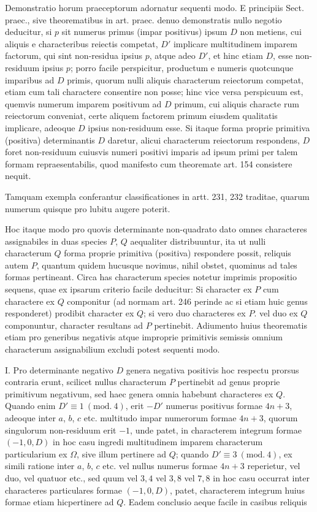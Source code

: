 Demonstratio horum praeceptorum adornatur sequenti modo. E principiis
Sect. praec., sive theorematibus in art. praec. denuo demonstratis nullo negotio
deducitur, si $p$ sit numerus primus (impar positivus) ipsum $D$ non metiens, cui
aliquis e characteribus reiectis competat, $D'$ implicare multitudinem imparem
factorum, qui sint non-residua ipsius $p$, atque adeo $D'$, et hinc etiam $D$, esse
non-residuum ipsius $p$; porro facile perspicitur, productum e numeris quotcunque
imparibus ad $D$ primis, quorum nulli aliquis characterum reiectorum competat,
etiam cum tali charactere consentire non posse; hinc vice versa perspicuum
est, quemvis numerum imparem positivum ad $D$ primum, cui aliquis characte%
%
rum reiectorum conveniat, certe aliquem factorem primum eiusdem qualitatis implicare,
adeoque $D$ ipsius non-residuum esse. Si itaque forma proprie primitiva
(positiva) determinantis $D$ daretur, alicui characterum reiectorum respondens,
$D$ foret non-residuum cuiusvis numeri positivi imparis ad ipsum primi per talem
formam repraesentabilis, quod manifesto cum theoremate art. 154 consistere
nequit.

Tamquam exempla conferantur classificationes in artt. 231, 232 traditae,
quarum numerum quisque pro lubitu augere poterit.

Hoc itaque modo pro quovis determinante non-quadrato dato omnes characteres
assignabiles in duas species $P$, $Q$ aequaliter distribuuntur, ita ut nulli
characterum $Q$ forma proprie primitiva (positiva) respondere possit, reliquis autem
$P$, quantum quidem hucusque novimus, nihil obstet, quominus ad tales formas
pertineant. Circa has characterum species notetur imprimis propositio sequens,
quae ex ipsarum criterio facile deducitur: Si character ex $P$ cum charactere
ex $Q$ componitur (ad normam art. 246 perinde ac si etiam huic genus
responderet) prodibit character ex $Q$; si vero duo characteres ex $P$. vel duo ex
$Q$ componuntur, character resultans ad $P$ pertinebit. Adiumento huius theorematis
etiam pro generibus negativis atque improprie primitivis semissis omnium
characterum assignabilium excludi potest sequenti modo.

I. Pro determinante negativo $D$ genera negativa positivis hoc respectu
prorsus contraria erunt, scilicet nullus characterum $P$ pertinebit ad genus proprie
primitivum negativum, sed haec genera omnia habebunt characteres ex $Q$.
Quando enim $D'\equiv1\ (\mathrm{mod.}\ 4)$, erit $-D'$ numerus positivus formae $4n+3$,
adeoque inter $a$, $b$, $c$ etc. multitudo impar numerorum formae $4n+3$, quorum
singulorum non-residuum erit $-1$, unde patet, in characterem integrum formae
$(-1,0,D)$ in hoc casu ingredi multitudinem imparem characterum particularium
ex $\Omega$, sive illum pertinere ad $Q$; quando $D'\equiv3\ (\mathrm{mod.}\ 4)$, ex simili ratione
inter $a$, $b$, $c$ etc. vel nullus numerus formae $4n+3$ reperietur, vel duo, vel
quatuor etc., sed quum vel $3,4$ vel $3,8$ vel $7,8$ in hoc casu occurrat inter characteres
particulares formae $(-1,0,D)$, patet, characterem integrum huius formae
etiam hic\textperiodcentered{}pertinere ad $Q$. Eadem conclusio aeque facile in casibus reliquis

